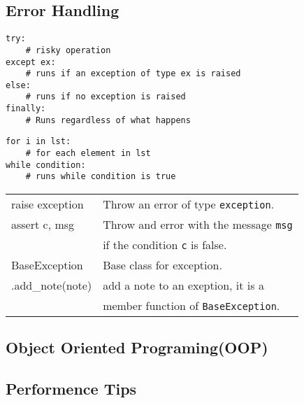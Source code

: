 \documentclass[5pt]{article}
\begin{document}
\begin{multicols}{2}
\subsection{Error Handling}
\begin{verbatim}
try:   
    # risky operation
except ex:
    # runs if an exception of type ex is raised
else:
    # runs if no exception is raised
finally: 
    # Runs regardless of what happens
\end{verbatim}
\begin{verbatim}
for i in lst:
    # for each element in lst
while condition:
    # runs while condition is true
\end{verbatim}
\begin{tabular}{>{\ttfamily}l l}
raise exception         & Throw an error of type \texttt{exception}. \\
assert c, msg           & Throw and error with the message \texttt{msg}\\
                        & if the condition \texttt{c} is false.\\
BaseException           & Base class for exception. \\
.add\_note(note)        & add a note to an exeption, it is a \\
                        & member function of \texttt{BaseException}. \\
\end{tabular}

\subsection{Object Oriented Programing(OOP)}

\subsection{Performence Tips}


\end{multicols}
\end{document}
